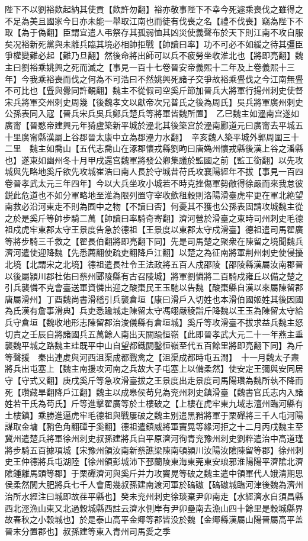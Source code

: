 陛下不以劉裕欻起納其使貢【欻許勿翻】裕亦敬事陛下不幸今死遽乘喪伐之雖得之不足為美且國家今日亦未能一舉取江南也而徒有伐喪之名【禮不伐喪】竊為陛下不取【為于偽翻】臣謂宜遣人弔祭存其孤弱恤其凶災使義聲布於天下則江南不攻自服矣况裕新死黨與未離兵臨其境必相帥拒戰【帥讀曰率】功不可必不如緩之待其彊臣爭權變難必起【難乃旦翻】然後命將出師可以兵不疲勞坐收淮北也【將即亮翻】魏主曰劉裕乘姚興之死而滅之【事見一百十七卷晉安帝義熙十二年及上卷義熙十三年】今我乘裕喪而伐之何為不可浩曰不然姚興死諸子交爭故裕乘舋伐之今江南無舋不可比也【舋與釁同許覲翻】魏主不從假司空奚斤節加晉兵大將軍行揚州刺史使督宋兵將軍交州刺史周幾【後魏孝文以獻帝次兄普氏之後為周氏】吳兵將軍廣州刺史公孫表同入寇【晉兵宋兵吳兵鄭兵楚兵等將軍皆魏所置】　乙巳魏主如灅南宫遂如廣甯【晉愍帝建興元年猗盧築新平城於灅北其後築宫於灅南酈道元曰廣甯去平城五十里廣甯縣漢屬上谷郡晉太康中立為郡灅力水翻】　辛亥魏人築平城外郭周圍三十二里　魏主如喬山【五代志喬山在涿郡懷戎縣劉昫曰唐媯州懷戎縣後漢上谷之潘縣也】遂東如幽州冬十月甲戌還宫魏軍將發公卿集議於監國之前【監工銜翻】以先攻城與先略地奚斤欲先攻城崔浩曰南人長於守城昔苻氏攻襄陽經年不拔【事見一百四卷晉孝武太元三年四年】今以大兵坐攻小城若不時克挫傷軍勢敵得徐嚴而來我怠彼鋭此危道也不如分軍略地至淮為限列置守宰收歛租穀則洛陽滑臺虎牢更在軍北絶望南救必沿河東走不則為囿中之物【不讀曰否】何憂其不獲也公孫表固請攻城魏主從之於是奚斤等帥步騎二萬【帥讀曰率騎奇寄翻】濟河營於滑臺之東時司州刺史毛德祖戍虎牢東郡太守王景度告急於德祖【王景度以東郡太守戍滑臺】德祖遣司馬翟廣等將步騎三千救之【翟長伯翻將即亮翻下同】先是司馬楚之聚衆在陳留之境聞魏兵濟河遣使迎降魏【先悉薦翻使疏吏翻降戶江翻】以楚之為征南將軍荆州刺史使侵擾北境【北謂宋之北境】德祖遣長社令王法政將五百人戍邵陵【邵陵縣漢屬汝南郡晉以後屬潁川郡杜佑曰蔡州郾陵縣有古召陵城】將軍劉憐將二百騎戍雍丘以備之楚之引兵襲憐不克會臺送軍資憐出迎之酸棗民王玉馳以告魏【酸棗縣自漢以來屬陳留郡唐屬滑州】丁酉魏尚書滑稽引兵襲倉垣【康曰滑戶入切姓也本滑伯國姬姓其後因國為氏漢有詹事滑典】兵吏悉踰城走陳留太守馮翊嚴稜詣斤降魏以王玉為陳留太守給兵守倉垣【魏收地形志陳留郡治浚儀縣有倉垣城】奚斤等攻滑臺不拔求益兵魏主怒切責之壬辰自將諸國兵五萬餘人南出天關踰恒嶺【此即晉孝武大元二十一年燕主垂襲魏平城之路魏主珪既平中山自望都鐵閼鑿恒嶺至代五百餘里將即亮翻下同】為斤等聲援　秦出連䖍與河西沮渠成都戰禽之【沮渠成都時屯五澗】　十一月魏太子燾將兵出屯塞上【魏主南援攻河南之兵故大子屯塞上以備柔然】使安定王彌與安同居守【守式又翻】庚戌奚斤等急攻滑臺拔之王景度出走景度司馬陽瓚為魏所執不降而死【瓚藏旱翻降戶江翻】魏主以成皋侯苟兒為兖州刺史鎮滑臺【魏書官氏志内入諸姓若干氏為苟氏】斤等進擊翟廣等於土樓破之【上樓在虎牢東九域志澶州臨河縣有土樓鎮】乘勝進逼虎牢毛德祖與戰屢破之魏主别遣黑矟將軍于栗磾將三千人屯河陽謀取金墉【矟色角翻磾于奚翻】德祖遣鎮威將軍竇晃等緣河拒之十二月丙戌魏主至冀州遣楚兵將軍徐州刺史叔孫建將兵自平原濟河徇青兖豫州刺史劉粹遣治中高道瑾將步騎五百據項城【宋豫州領汝南新蔡譙梁陳南頓潁川汝陽汝隂陳留等郡】徐州刺史王仲德將兵屯湖陸【徐州領彭城沛下邳蘭陵東海東莞東安琅邪淮陽陽平濟隂北濟隂鍾離馬頭等郡】于栗磾濟河與奚斤并力攻竇晃等破之魏主遣中領軍代人娥清期思侯柔然閭大肥將兵七千人會周幾叔孫建南渡河軍於碻磝【碻磝城臨河津後魏為濟州治所水經注曰城即故荏平縣也】癸未兖州刺史徐琰棄尹卯南走【水經濟水自須昌縣西北涇漁山東又北過穀城縣西註云濟水側岸有尹卯壘南去漁山四十餘里是穀城縣界故春秋之小穀城也】於是泰山高平金鄊等郡皆没於魏【金鄊縣漢屬山陽晉屬高平盖晉末分置郡也】叔孫建等東入青州司馬愛之季